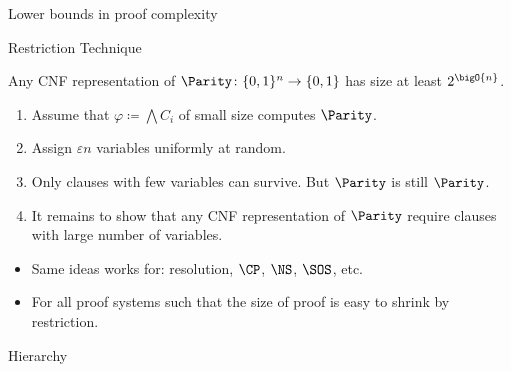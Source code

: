 \begin{frame}{Lower bounds in proof complexity}

    
\end{frame}

\begin{frame}{Restriction Technique}

    \begin{lemma}
        Any CNF representation of $\Parity\colon \{0, 1\}^n \to \{0, 1\}$ has size at least
        $2^{\bigO{n}}$.
    \end{lemma}

    \pause
    \begin{enumerate}
        \item Assume that $\varphi \coloneqq \bigwedge C_i$ of small size computes $\Parity$.
            \pause
        \item Assign $\varepsilon n$ variables uniformly at random.
            \pause
        \item Only clauses with few variables can survive. But $\Parity$ is still $\Parity$.
            \pause
        \item It remains to show that any CNF representation of $\Parity$ require clauses with large
            number of variables.
    \end{enumerate}

    \pause
    \vspace{0.5cm}
    \begin{itemize}
        \item Same ideas works for: resolution, $\CP$, $\NS$, $\SOS$, etc.
        \item For all proof systems such that the size of proof is easy to shrink by
            restriction.  
    \end{itemize}

\end{frame}

\begin{frame}{Hierarchy}

    
    
\end{frame}